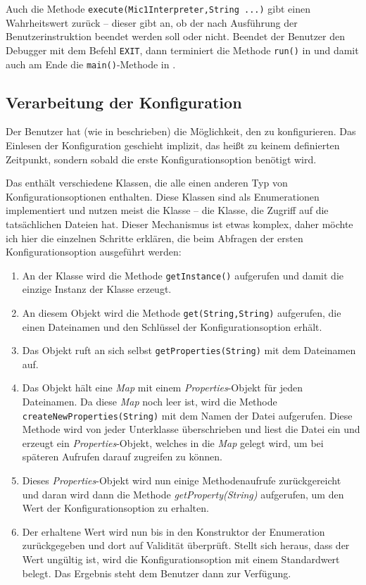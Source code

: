 Auch die Methode \texttt{execute(Mic1Interpreter,String ...)} gibt einen Wahrheitswert zurück -- dieser gibt an, ob der \md nach Ausführung der Benutzerinstruktion beendet werden soll oder nicht. Beendet der Benutzer den Debugger mit dem Befehl \texttt{EXIT}, dann terminiert die Methode \texttt{run()} in  und damit auch am Ende die \texttt{main()}-Methode in .

\subsection{Verarbeitung der Konfiguration}
Der Benutzer hat (wie in  beschrieben) die Möglichkeit, den \md zu konfigurieren. Das Einlesen der Konfiguration geschieht implizit, das heißt zu keinem definierten Zeitpunkt, sondern sobald die erste Konfigurationsoption benötigt wird.

Das \package {} enthält verschiedene Klassen, die alle einen anderen Typ von Konfigurationsoptionen enthalten. Diese Klassen sind als Enumerationen implementiert und nutzen meist die Klasse  -- die Klasse, die Zugriff auf die tatsächlichen Dateien hat. Dieser Mechanismus ist etwas komplex, daher möchte ich hier die einzelnen Schritte erklären, die beim Abfragen der ersten Konfigurationsoption ausgeführt werden:

\begin{enumerate}
\item An der Klasse  wird die Methode \texttt{getInstance()} aufgerufen und damit die einzige Instanz der Klasse erzeugt.
\item An diesem Objekt wird die Methode \texttt{get(String,String)} aufgerufen, die einen Dateinamen und den Schlüssel der Konfigurationsoption erhält.
\item Das Objekt ruft an sich selbst \texttt{getProperties(String)} mit dem Dateinamen auf.
\item Das Objekt hält eine \emph{Map} mit einem \emph{Properties}-Objekt für jeden Dateinamen. Da diese \emph{Map} noch leer ist, wird die Methode \texttt{createNewProperties(String)} mit dem Namen der Datei aufgerufen. Diese Methode wird von jeder Unterklasse überschrieben und liest die Datei ein und erzeugt ein \emph{Properties}-Objekt, welches in die \emph{Map} gelegt wird, um bei späteren Aufrufen darauf zugreifen zu können.
\item Dieses \emph{Properties}-Objekt wird nun einige Methodenaufrufe zurückgereicht und daran wird dann die Methode \emph{getProperty(String)} aufgerufen, um den Wert der Konfigurationsoption zu erhalten.
\item Der erhaltene Wert wird nun bis in den Konstruktor der Enumeration zurückgegeben und dort auf Validität überprüft. Stellt sich heraus, dass der Wert ungültig ist, wird die Konfigurationsoption mit einem Standardwert belegt. Das Ergebnis steht dem Benutzer dann zur Verfügung.
\end{enumerate}


